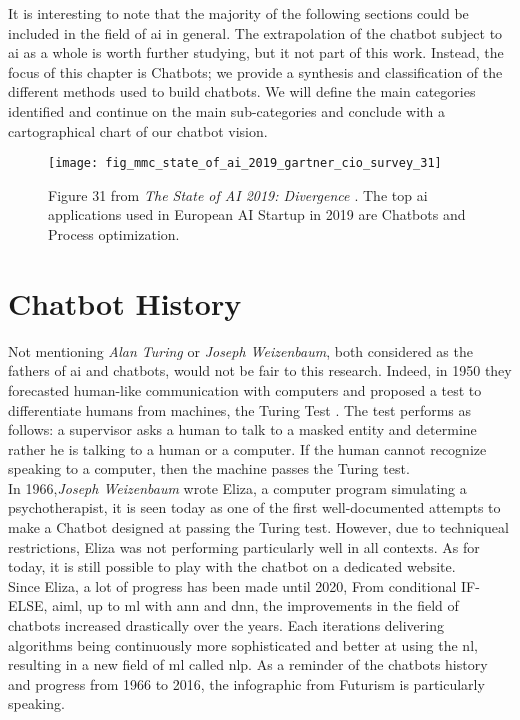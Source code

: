 It is interesting to note that the majority of the following sections could be included in the field of \gls{ai} in general. The extrapolation of the chatbot subject to \gls{ai} as a whole is worth further studying, but it not part of this work. Instead, the focus of this chapter is Chatbots; we provide a synthesis and classification of the different methods used to build chatbots. We will define the main categories identified and continue on the main sub-categories and conclude with a cartographical chart of our chatbot vision.



\begin{figure}
    \centering
    \texttt{[image: fig\_mmc\_state\_of\_ai\_2019\_gartner\_cio\_survey\_31]}
    \caption{Figure 31 from \textit{The State of AI 2019: Divergence \autocite{report:Kelnar2019}}. The top \gls{ai} applications used in European AI Startup in 2019 are Chatbots and Process optimization.}
    \label{fig:fig_mmc_state_of_ai_2019_gartner_cio_survey_31}
\end{figure}



\section{Chatbot History}
\label{chatbot:history}
Not mentioning \textit{Alan Turing} or \textit{Joseph Weizenbaum}, both considered as the fathers of \gls{ai} and chatbots, would not be fair to this research. Indeed, in 1950 they forecasted human-like communication with computers and proposed a test to differentiate humans from machines, the Turing Test \autocite{paper:turing}. The test performs as follows: a supervisor asks a human to talk to a masked entity and determine rather he is talking to a human or a computer. If the human cannot recognize speaking to a computer, then the machine passes the Turing test.\\

In 1966,\textit{Joseph Weizenbaum} wrote Eliza\autocite{website:eliza}, a computer program simulating a psychotherapist, it is seen today as one of the first well-documented attempts to make a Chatbot designed at passing the Turing test. However, due to techniqueal restrictions, Eliza was not performing particularly well in all contexts. As for today, it is still possible to play with the chatbot on a dedicated website.\\

Since Eliza, a lot of progress has been made until 2020, From conditional IF-ELSE, \gls{aiml}, up to \gls{ml} with \gls{ann} and \gls{dnn}, the improvements in the field of chatbots increased drastically over the years. Each iterations delivering algorithms being continuously more sophisticated and better at using the \gls{nl}, resulting in a new field of \gls{ml} called \gls{nlp}. As a reminder of the chatbots history and progress from 1966 to 2016, the  infographic\autocite{online:futurism_history_infography} from Futurism is particularly speaking. 


